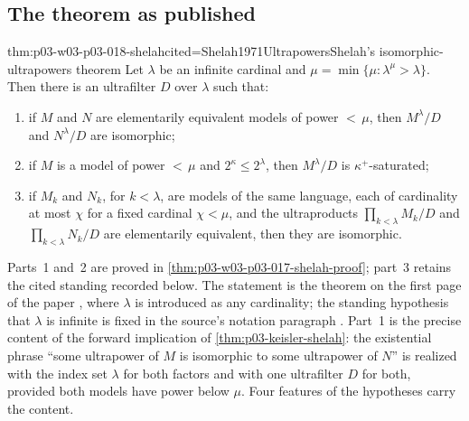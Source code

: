 \subsection{The theorem as published}

\begin{hbtheorem}{thm:p03-w03-p03-018-shelah}{cited=Shelah1971Ultrapowers}{Shelah's isomorphic-ultrapowers theorem}
Let \(\lambda\) be an infinite cardinal and
\(\mu=\min\{\mu:\lambda^\mu>\lambda\}\).  Then there is an ultrafilter \(D\)
over \(\lambda\) such that:
\begin{enumerate}
  \item if \(M\) and \(N\) are elementarily equivalent models of power
        \({<}\,\mu\), then \(M^\lambda/D\) and \(N^\lambda/D\) are
        isomorphic;
  \item if \(M\) is a model of power \({<}\,\mu\) and \(2^\kappa\le2^\lambda\),
        then \(M^\lambda/D\) is \(\kappa^+\)-saturated;
  \item if \(M_k\) and \(N_k\), for \(k<\lambda\), are models of the same
        language, each of cardinality at most \(\chi\) for a fixed cardinal
        \(\chi<\mu\), and the ultraproducts \(\prod_{k<\lambda}M_k/D\) and
        \(\prod_{k<\lambda}N_k/D\) are elementarily equivalent, then they are
        isomorphic.
\end{enumerate}
\end{hbtheorem}

Parts~1 and~2 are proved in
\cref{thm:p03-w03-p03-017-shelah-proof}; part~3 retains the cited
standing recorded below. The statement is the theorem on the first page
of the paper \cite[224]{Shelah1971Ultrapowers}, where \(\lambda\) is introduced as any
cardinality; the standing hypothesis that \(\lambda\) is infinite is fixed in
the source's notation paragraph \cite[225]{Shelah1971Ultrapowers}.  Part~1 is
the precise content of the forward implication of
\cref{thm:p03-keisler-shelah}: the existential phrase ``some ultrapower of
\(M\) is isomorphic to some ultrapower of \(N\)'' is realized with the index
set \(\lambda\) for both factors and with one ultrafilter \(D\) for both,
provided both models have power below \(\mu\).  Four features of the
hypotheses carry the content.

